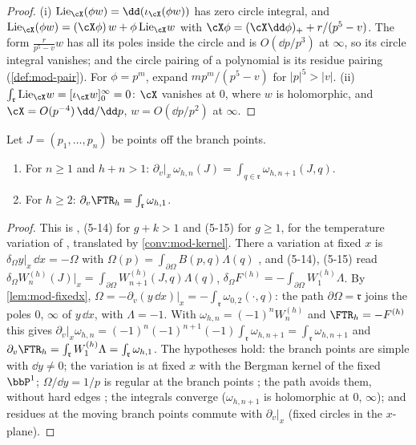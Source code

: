 \begin{proof}
(i) $\mathrm{Lie}_{\cX}(\phi w)=\dd(\iota_{\cX}(\phi w))$ has zero circle integral, and $\mathrm{Lie}_{\cX}(\phi w)=(\cX\phi)\,w+\phi\,\mathrm{Lie}_{\cX}w$ with $\cX\phi=(\cX\dd\phi)_++r/(p^5-v)$. The form $\frac{r}{p^5-v}w$ has all its poles inside the circle and is $O(\dd p/p^3)$ at $\infty$, so its circle integral vanishes; and the circle pairing of a polynomial is its residue pairing (\cref{def:mod-pair}). For $\phi=p^m$, expand $mp^m/(p^5-v)$ for $|p|^5>|v|$. (ii) $\int_{\mathfrak r}\mathrm{Lie}_{\cX}w=[\iota_{\cX}w]_0^\infty=0$: $\cX$ vanishes at $0$, where $w$ is holomorphic, and $\cX=O(p^{-4})\,\dd/\dd p$, $w=O(\dd p/p^2)$ at $\infty$.
\end{proof}

\begin{thm}
\label{thm:mod-var}
Let $J=(p_1,\dots,p_n)$ be points off the branch points.
\begin{enumerate}
\item For $n\geq 1$ and $h+n>1$: $\partial_v|_x\,\omega_{h,n}(J)=\int_{q\in\mathfrak r}\omega_{h,n+1}(J,q)$.
\item For $h\geq 2$: $\partial_v\FTR_h=\int_{\mathfrak r}\omega_{h,1}$.
\end{enumerate}
\end{thm}

\begin{proof}
This is \cite[Thm.~5.1]{Eynard:2007kz}, (5-14) for $g+k>1$ and (5-15) for $g\geq 1$, for the temperature variation of \cite[\S5.3, (5-27)--(5-30)]{Eynard:2007kz}, translated by \cref{conv:mod-kernel}. There a variation at fixed $x$ is $\delta_\Omega y|_x\,\dd x=-\Omega$ \cite[(5-1)]{Eynard:2007kz} with $\Omega(p)=\int_{\partial\Omega}B(p,q)\Lambda(q)$ \cite[(5-13)]{Eynard:2007kz}, and (5-14), (5-15) read $\delta_\Omega W^{(h)}_n(J)|_{x}=\int_{\partial\Omega}W^{(h)}_{n+1}(J,q)\Lambda(q)$, $\delta_\Omega F^{(h)}=-\int_{\partial\Omega}W^{(h)}_1\Lambda$. By \cref{lem:mod-fixedx}, $\Omega=-\partial_v(y\,\dd x)|_x=-\int_{\mathfrak r}\omega_{0,2}(\cdot,q)$: the path $\partial\Omega=\mathfrak r$ joins the poles $0$, $\infty$ of $y\,\dd x$, with $\Lambda=-1$. With $\omega_{h,n}=(-1)^nW^{(h)}_n$ and $\FTR_h=-F^{(h)}$ this gives $\partial_v|_x\omega_{h,n}=(-1)^{n}(-1)^{n+1}(-1)\int_{\mathfrak r}\omega_{h,n+1}=\int_{\mathfrak r}\omega_{h,n+1}$ and $\partial_v\FTR_h=\int_{\mathfrak r}W^{(h)}_1\Lambda=\int_{\mathfrak r}\omega_{h,1}$. The hypotheses hold: the branch points are simple with $\dd y\neq 0$; the variation is at fixed $x$ with the Bergman kernel of the fixed $\bbP^1$; $\Omega/\dd y=1/p$ is regular at the branch points \cite[(5-4)]{Eynard:2007kz}; the path avoids them, without hard edges \cite[(5-13), footnote~8]{Eynard:2007kz}; the integrals converge ($\omega_{h,n+1}$ is holomorphic at $0$, $\infty$); and residues at the moving branch points commute with $\partial_v|_x$ (fixed circles in the $x$-plane).
\end{proof}

